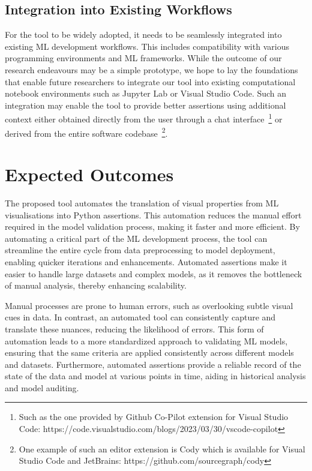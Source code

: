 \documentclass[sigconf]{acmart}
\begin{document}
\subsection{Integration into Existing Workflows}

For the tool to be widely adopted, it needs to be seamlessly
integrated into existing ML development workflows. This includes
compatibility with various programming environments and ML frameworks.
While the outcome of our research endeavours may be a simple
prototype, we hope to lay the foundations that enable future
researchers to integrate our tool into existing computational notebook
environments such as Jupyter Lab or Visual Studio Code. Such an
integration may enable the tool to provide better assertions using
additional context either obtained directly from the user through
a chat interface~\footnote{Such as the one provided by Github Co-Pilot
extension for Visual Studio Code:
https://code.visualstudio.com/blogs/2023/03/30/vscode-copilot} or
derived from the entire software codebase~\footnote{One example of
such an editor extension is Cody which is available for Visual Studio
Code and JetBrains: https://github.com/sourcegraph/cody}.

\section{Expected Outcomes}

The proposed tool automates the translation of visual properties from ML
visualisations into Python assertions. This automation reduces the
manual effort required in the model validation process, making it
faster and more efficient. By automating a critical part of the ML
development process, the tool can streamline the entire cycle from
data preprocessing to model deployment, enabling quicker iterations
and enhancements. Automated assertions make it easier to handle large
datasets and complex models, as it removes the bottleneck of manual
analysis, thereby enhancing scalability.

Manual processes are prone to human errors, such as overlooking subtle
visual cues in data. In contrast, an automated tool can consistently
capture and translate these nuances, reducing the likelihood of
errors. This form of automation leads to a more standardized approach
to validating ML models, ensuring that the same criteria are applied
consistently across different models and datasets. Furthermore,
automated assertions provide a reliable record of the state of the
data and model at various points in time, aiding in historical
analysis and model auditing.
\end{document}
